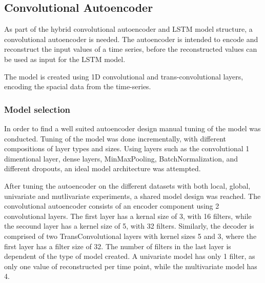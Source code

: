 
\subsection{Convolutional Autoencoder}
\label{section:Method:CNN-AE-LSTM:AE}



As part of the hybrid convolutional autoencoder and LSTM model structure,
a convolutional autoencoder is needed.
The autoencoder is intended to encode and reconstruct the input values of a time series,
before the reconstructed values can be used as input for the LSTM model.

The model is created using 1D convolutional and trans-convolutional layers,
encoding the spacial data from the time-series.


\subsubsection{Model selection}

In order to find a well suited autoencoder design manual tuning of the model was conducted.
Tuning of the model was done incrementally, with different compositions of layer types and sizes.
Using layers such as the convolutional 1 dimentional layer, dense layers, MinMaxPooling, BatchNormalization, and different dropouts,
an ideal model architecture was attempted.

After tuning the autoencoder on the different datasets with both local, global, univariate and mutlivariate experiments,
a shared model design was reached.
The convolutional autoencoder consists of an encoder component using 2 convolutional layers.
The first layer has a kernal size of 3, with 16 filters, while the secound layer has a kernel size of 5, with 32 filters.
Similarly, the decoder is comprised of two TransConvolutional layers with kernel sizes 5 and 3, where the first layer has a filter size of 32.
The number of filters in the last layer is dependent of the type of model created. A univariate model has only 1 filter, as only one value of reconstructed per time point,
while the multivariate model has 4.

